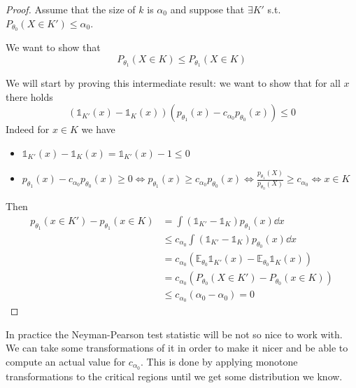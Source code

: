 \documentclass[12pt]{extarticle}
\newcommand{\E}{\mathds{E}}
\begin{document}
\begin{proof}
    Assume that the size of $k$ is $\alpha_0$ and
    suppose that $\exists K'$ s.t. $P_{\theta_0}(X \in K')\leq \alpha_0$.

    We want to show that
    \begin{equation}
        P_{\theta_1}(X \in K) \leq P_{\theta_1}(X \in K)
    \end{equation}

    We will start by proving this intermediate result:
    we want to show that for all $x$ there holds
    \begin{equation}
        (\mathds 1_{K'}(x) - \mathds 1_{K}(x))(p_{\theta_1}(x) - c_{\alpha_0}p_{\theta_0}(x)) \leq 0
    \end{equation}
    Indeed for $x \in K$ we have
    \begin{itemize}
        \item $\mathds 1_{K'}(x) - \mathds 1_{K}(x) = \mathds 1_{K'}(x) -1 \leq 0$
        \item $p_{\theta_1}(x) - c_{\alpha_0}p_{\theta_0}(x) \geq 0 \iff p_{\theta_1}(x) \geq c_{\alpha_0}p_{\theta_0}(x) \iff \frac{p_{\theta_1}(X)}{p_{\theta_0}(X)} \geq c_{\alpha_0} \iff x \in K$
    \end{itemize}

    Then
    \begin{align}
        p_{\theta_1}(x \in K') - p_{\theta_1}(x \in K) & = \int (\mathds 1_{K'} - \mathds 1_{K}) p_{\theta_1}(x) \dd x                   \\
                                                       & \leq c_{\alpha_0} \int (\mathds 1_{K'} - \mathds 1_{K}) p_{\theta_0}(x) \dd x   \\
                                                       & = c_{\alpha_0} (\E_{\theta_0} \mathds 1_{K'}(x) - \E_{\theta_0} \mathds 1_K(x)) \\
                                                       & = c_{\alpha_0} (P_{\theta_0}(X \in K') - P_{\theta_0}(x \in K))                 \\
                                                       & \leq c_{\alpha_0} (\alpha_0 - \alpha_0) = 0
    \end{align}
\end{proof}

In practice the Neyman-Pearson test statistic will be not so nice to work with.
We can take some transformations of it in order to make it nicer and
be able to compute an actual value for $c_{\alpha_0}$.
This is done by applying monotone transformations to the critical regions
until we get some distribution we know.
\end{document}
